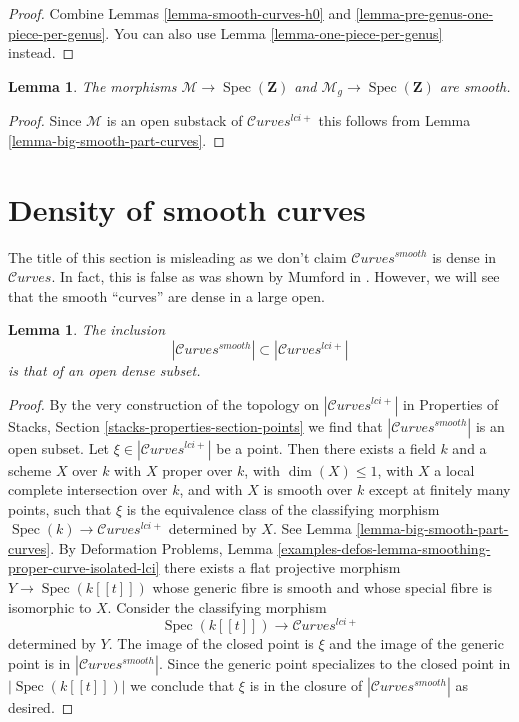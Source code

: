 \documentclass{stacks-project}
\theoremstyle{plain}
\newtheorem{lemma}[subsection]{Lemma}
\theoremstyle{definition}
\theoremstyle{remark}
\numberwithin{equation}{subsection}
\def\Spec{\mathop{\mathrm{Spec}}}
\def\Curvesstack{\mathcal{C}\!\mathit{urves}}
\begin{document}
\begin{proof}
Combine Lemmas \ref{lemma-smooth-curves-h0} and
\ref{lemma-pre-genus-one-piece-per-genus}.
You can also use
Lemma \ref{lemma-one-piece-per-genus}
instead.
\end{proof}

\begin{lemma}
\label{lemma-smooth-curves-h0-smooth}
The morphisms $\mathcal{M} \to \Spec(\mathbf{Z})$ and
$\mathcal{M}_g \to \Spec(\mathbf{Z})$
are smooth.
\end{lemma}

\begin{proof}
Since $\mathcal{M}$ is an open substack of
$\Curvesstack^{lci+}$ this follows from
Lemma \ref{lemma-big-smooth-part-curves}.
\end{proof}





\section{Density of smooth curves}
\label{section-smooth-is-dense}

\noindent
The title of this section is misleading as we don't claim
$\Curvesstack^{smooth}$ is dense in $\Curvesstack$.
In fact, this is false as was shown by Mumford in \cite{PathologiesIV}.
However, we will see that the smooth ``curves'' are dense
in a large open.

\begin{lemma}
\label{lemma-smooth-dense}
The inclusion
$$
|\Curvesstack^{smooth}| \subset |\Curvesstack^{lci+}|
$$
is that of an open dense subset.
\end{lemma}

\begin{proof}
By the very construction of the topology on
$|\Curvesstack^{lci+}|$ in
Properties of Stacks, Section \ref{stacks-properties-section-points}
we find that $|\Curvesstack^{smooth}|$
is an open subset. Let $\xi \in |\Curvesstack^{lci+}|$ be a point.
Then there exists a field $k$ and a scheme $X$ over $k$
with $X$ proper over $k$, with $\dim(X) \leq 1$,
with $X$ a local complete intersection over $k$, and
with $X$ is smooth over $k$ except at finitely many points, such
that $\xi$ is the equivalence class of the
classifying morphism $\Spec(k) \to \Curvesstack^{lci+}$ determined by $X$.
See Lemma \ref{lemma-big-smooth-part-curves}.
By Deformation Problems, Lemma
\ref{examples-defos-lemma-smoothing-proper-curve-isolated-lci}
there exists a flat projective morphism $Y \to \Spec(k[[t]])$
whose generic fibre is smooth and whose special fibre is
isomorphic to $X$. Consider the classifying morphism
$$
\Spec(k[[t]]) \longrightarrow \Curvesstack^{lci+}
$$
determined by $Y$. The image of the closed point is $\xi$
and the image of the generic point is in $|\Curvesstack^{smooth}|$.
Since the generic point specializes to the closed point in
$|\Spec(k[[t]])|$ we conclude that $\xi$ is in the closure
of $|\Curvesstack^{smooth}|$ as desired.
\end{proof}
\end{document}
